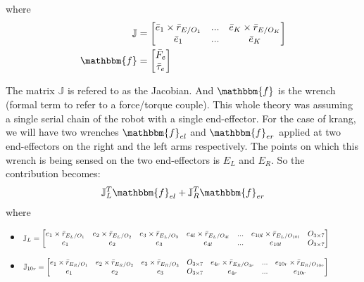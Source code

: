 \documentclass[a4paper,10pt]{article}
\newcommand\scalemath[2]{\scalebox{#1}{\mbox{\ensuremath{\displaystyle #2}}}}
\begin{document}
where
\begin{align}
 \mathbb{J} &= \left[\begin{matrix} \bar{e}_1 \times \bar{r}_{E/O_1} & ... & \bar{e}_K \times \bar{r}_{E/O_K} \\ \bar{e}_1 & ... & \bar{e}_K\end{matrix} \right] \nonumber \\
 \mathbbm{f} &= \left[\begin{matrix} \bar{F}_e \\ \bar{\tau}_e \end{matrix} \right] \nonumber
\end{align}

The matrix $\mathbb{J}$ is refered to as the Jacobian. And $\mathbbm{f}$ is the wrench (formal term to
refer to a force/torque couple). This whole theory was assuming a single serial chain of the robot with a single
end-effector. For the case of krang, we will have two wrenches $\mathbbm{f}_{el}$ and $\mathbbm{f}_{er}$ applied at 
two end-effectors on the right and the left arms respectively. The points on which this wrench is being sensed
on the two end-effectors is $E_L$ and $E_R$. So the contribution becomes:
\begin{align}
 \mathbb{J}_{L}^T\mathbbm{f}_{el} + \mathbb{J}_{R}^T\mathbbm{f}_{er}
\end{align} where
\begin{itemize}
 \item $\scalemath{0.775}{\mathbb{J}_{L} = \left[ \begin{matrix} e_1\times \bar{r}_{E_L/O_1} & e_2\times \bar{r}_{E_L/O_2} 
 & e_3\times \bar{r}_{E_L/O_3} & e_{4l}\times \bar{r}_{E_L/O_{4l}} & ... & e_{10l}\times \bar{r}_{E_L/O_{10l}} & O_{3\times 7} \\ 
 e_1 & e_2 & e_3 & e_{4l} & ... & e_{10l} & O_{3\times 7} \end{matrix} \right]}$
 \item $\scalemath{0.75}{\mathbb{J}_{10r} = \left[ \begin{matrix} e_1\times \bar{r}_{E_R/O_1} & e_2\times \bar{r}_{E_R/O_2} 
 & e_3\times \bar{r}_{E_R/O_3} & O_{3\times 7} & e_{4r}\times \bar{r}_{E_R/O_{4r}} & ... & e_{10r}\times \bar{r}_{E_R/O_{10r}} \\ 
 e_1 & e_2 & e_3 & O_{3\times 7} & e_{4r} & ... & e_{10r}  \end{matrix} \right]}$
\end{itemize}
\end{document}
